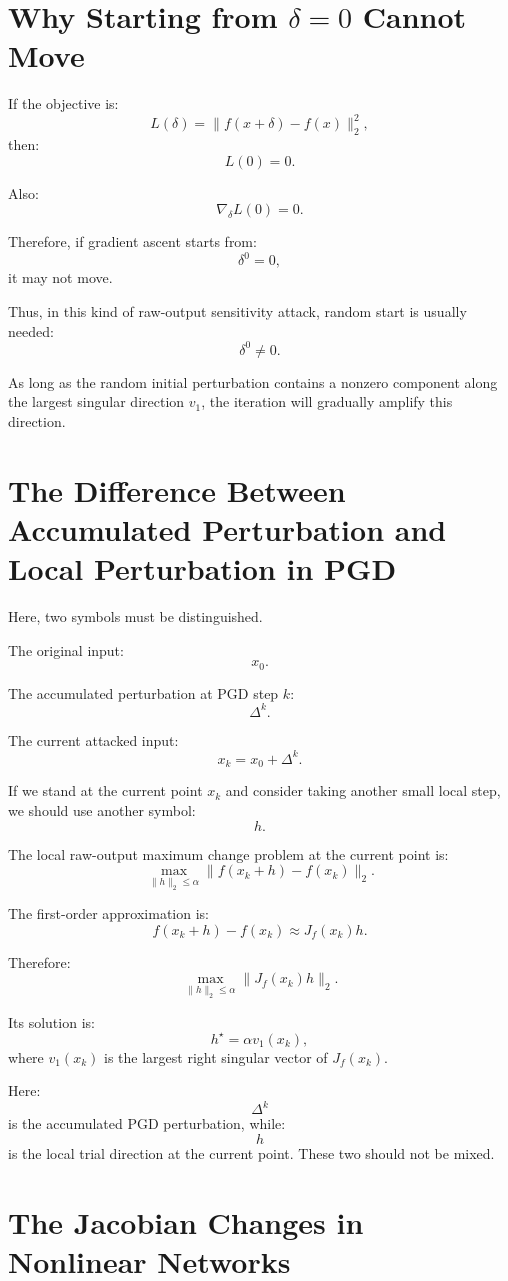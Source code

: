 \documentclass{article}
\begin{document}
\section{Why Starting from \(\delta=0\) Cannot Move}

If the objective is:
\[
L(\delta)=\|f(x+\delta)-f(x)\|_2^2,
\]
then:
\[
L(0)=0.
\]

Also:
\[
\nabla_\delta L(0)=0.
\]

Therefore, if gradient ascent starts from:
\[
\delta^0=0,
\]
it may not move.

Thus, in this kind of raw-output sensitivity attack, random start is usually needed:
\[
\delta^0\neq 0.
\]

As long as the random initial perturbation contains a nonzero component along the largest singular direction \(v_1\), the iteration will gradually amplify this direction.

\section{The Difference Between Accumulated Perturbation and Local Perturbation in PGD}

Here, two symbols must be distinguished.

The original input:
\[
x_0.
\]

The accumulated perturbation at PGD step \(k\):
\[
\Delta^k.
\]

The current attacked input:
\[
x_k=x_0+\Delta^k.
\]

If we stand at the current point \(x_k\) and consider taking another small local step, we should use another symbol:
\[
h.
\]

The local raw-output maximum change problem at the current point is:
\[
\max_{\|h\|_2\leq \alpha}
\|f(x_k+h)-f(x_k)\|_2.
\]

The first-order approximation is:
\[
f(x_k+h)-f(x_k)
\approx
J_f(x_k)h.
\]

Therefore:
\[
\max_{\|h\|_2\leq \alpha}
\|J_f(x_k)h\|_2.
\]

Its solution is:
\[
h^\star=\alpha v_1(x_k),
\]
where \(v_1(x_k)\) is the largest right singular vector of \(J_f(x_k)\).

Here:
\[
\Delta^k
\]
is the accumulated PGD perturbation, while:
\[
h
\]
is the local trial direction at the current point. These two should not be mixed.

\section{The Jacobian Changes in Nonlinear Networks}
\end{document}
